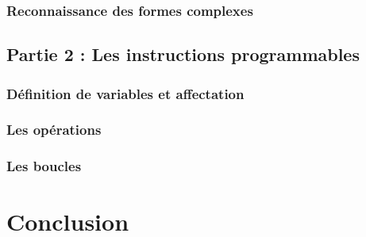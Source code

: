 		\subsection{Reconnaissance des formes complexes}
	
	\section{Partie 2 : Les instructions programmables}

		\subsection{Définition de variables et affectation}
		
		\subsection{Les opérations}

		\subsection{Les boucles}

\chapter*{Conclusion}



